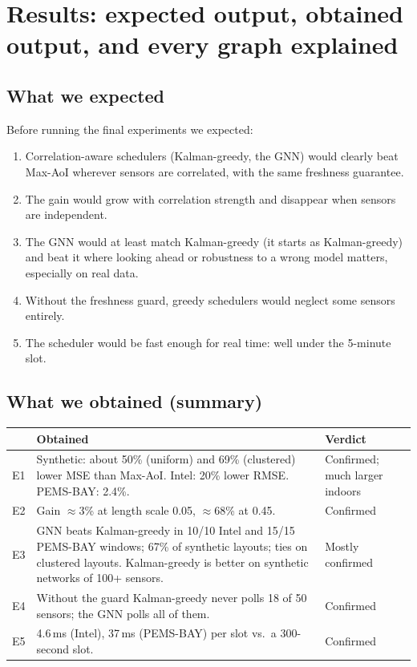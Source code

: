 \section{Results: expected output, obtained output, and every graph explained}

\subsection{What we expected}
Before running the final experiments we expected:
\begin{enumerate}[label=\textbf{E\arabic*}]
  \item Correlation-aware schedulers (Kalman-greedy, the GNN) would clearly beat Max-AoI wherever sensors are
        correlated, with the same freshness guarantee.
  \item The gain would grow with correlation strength and disappear when sensors are independent.
  \item The GNN would at least match Kalman-greedy (it starts as Kalman-greedy) and beat it where looking ahead or
        robustness to a wrong model matters, especially on real data.
  \item Without the freshness guard, greedy schedulers would neglect some sensors entirely.
  \item The scheduler would be fast enough for real time: well under the 5-minute slot.
\end{enumerate}

\subsection{What we obtained (summary)}
\begin{center}
\small
\begin{tabularx}{\textwidth}{@{}lXl@{}}
\toprule
& \textbf{Obtained} & \textbf{Verdict} \\
\midrule
E1 & Synthetic: about 50\% (uniform) and 69\% (clustered) lower MSE than Max-AoI. Intel: 20\% lower RMSE. PEMS-BAY: 2.4\%. & Confirmed; much larger indoors \\
E2 & Gain $\approx$3\% at length scale 0.05, $\approx$68\% at 0.45. & Confirmed \\
E3 & GNN beats Kalman-greedy in 10/10 Intel and 15/15 PEMS-BAY windows; 67\% of synthetic layouts; ties on clustered layouts. Kalman-greedy is better on synthetic networks of 100+ sensors. & Mostly confirmed \\
E4 & Without the guard Kalman-greedy never polls 18 of 50 sensors; the GNN polls all of them. & Confirmed \\
E5 & 4.6\,ms (Intel), 37\,ms (PEMS-BAY) per slot vs.\ a 300-second slot. & Confirmed \\
\bottomrule
\end{tabularx}
\end{center}

